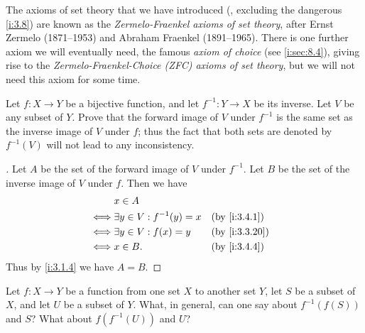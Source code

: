 \setcounter{thm}{11}
\begin{rmk}\label{i:3.4.12}
  The axioms of set theory that we have introduced (, excluding the dangerous \cref{i:3.8}) are known as the \emph{Zermelo-Fraenkel axioms of set theory}, after Ernst Zermelo (1871--1953) and Abraham Fraenkel (1891--1965).
  There is one further axiom we will eventually need, the famous \emph{axiom of choice} (see \cref{i:sec:8.4}), giving rise to the \emph{Zermelo-Fraenkel-Choice (ZFC) axioms of set theory}, but we will not need this axiom for some time.
\end{rmk}

\exercisesection

\begin{ex}\label{i:ex:3.4.1}
  Let \(f : X \to Y\) be a bijective function, and let \(f^{-1} : Y \to X\) be its inverse.
  Let \(V\) be any subset of \(Y\).
  Prove that the forward image of \(V\) under \(f^{-1}\) is the same set as the inverse image of \(V\) under \(f\);
  thus the fact that both sets are denoted by \(f^{-1}(V)\) will not lead to any inconsistency.
\end{ex}

\begin{proof}[]
  Let \(A\) be the set of the forward image of \(V\) under \(f^{-1}\).
  Let \(B\) be the set of the inverse image of \(V\) under \(f\).
  Then we have
  \begin{align*}
         & x \in A                                            \\
    \iff & \exists y \in V : f^{-1}(y) = x &  & \by{i:3.4.1}  \\
    \iff & \exists y \in V : f(x) = y      &  & \by{i:3.3.20} \\
    \iff & x \in B.                        &  & \by{i:3.4.4}
  \end{align*}
  Thus by \cref{i:3.1.4} we have \(A = B\).
\end{proof}

\begin{ex}\label{i:ex:3.4.2}
  Let \(f : X \to Y\) be a function from one set \(X\) to another set \(Y\), let \(S\) be a subset of \(X\), and let \(U\) be a subset of \(Y\).
  What, in general, can one say about \(f^{-1}(f(S))\) and \(S\)?
  What about \(f(f^{-1}(U))\) and \(U\)?
\end{ex}

